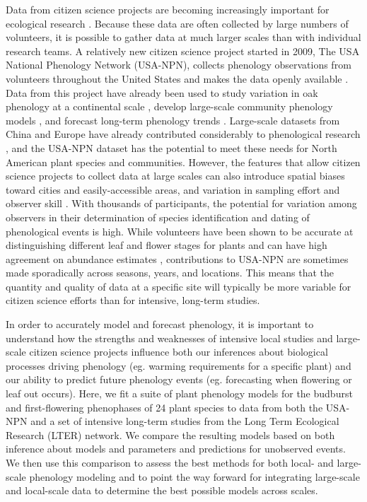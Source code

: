 \documentclass[fleqn,12pt,lineno]{article}
\begin{document}
Data from citizen science projects are becoming increasingly important for ecological research \citep{kelling2009, dickinson2010, tulloch2013}. Because these data are often collected by large numbers of volunteers, it is possible to gather data at much larger scales than with individual research teams. A relatively new citizen science project started in 2009, The USA National Phenology Network (USA-NPN), collects phenology observations from volunteers throughout the United States and makes the data openly available \citep{npncitation}. Data from this project have already been used to study variation in oak phenology at a continental scale \citep{gerst2017}, develop large-scale community phenology models \citep{melaas2016}, and forecast long-term phenology trends \citep{jeong2013}. Large-scale datasets from China and Europe have already contributed considerably to phenological research \citep{xu2013, olsson2014, basler2016, zhang2017}, and the USA-NPN dataset has the potential to meet these needs for North American plant species and communities. However, the features that allow citizen science projects to collect data at large scales can also introduce spatial biases toward cities and easily-accessible areas, and variation in sampling effort and observer skill \citep{dickinson2010}. With thousands of participants, the potential for variation among observers in their determination of species identification and dating of phenological events is high. While volunteers have been shown to be accurate at distinguishing different leaf and flower stages for plants \citep{fuccillo2015} and can have high agreement on abundance estimates \citep{feldman2018}, contributions to USA-NPN are sometimes made sporadically across seasons, years, and locations. This means that the quantity and quality of data at a specific site will typically be more variable for citizen science efforts than for intensive, long-term studies.

In order to accurately model and forecast phenology, it is important to understand how the strengths and weaknesses of intensive local studies and large-scale citizen science projects influence both our inferences about biological processes driving phenology (eg. warming requirements for a specific plant) and our ability to predict future phenology events (eg. forecasting when flowering or leaf out occurs). Here, we fit a suite of plant phenology models for the budburst and first-flowering phenophases of 24 plant species to data from both the USA-NPN and a set of intensive long-term studies from the Long Term Ecological Research (LTER) network. We compare the resulting models based on both inference about models and parameters and predictions for unobserved events. We then use this comparison to assess the best methods for both local- and large-scale phenology modeling and to point the way forward for integrating large-scale and local-scale data to determine the best possible models across scales.
\end{document}
